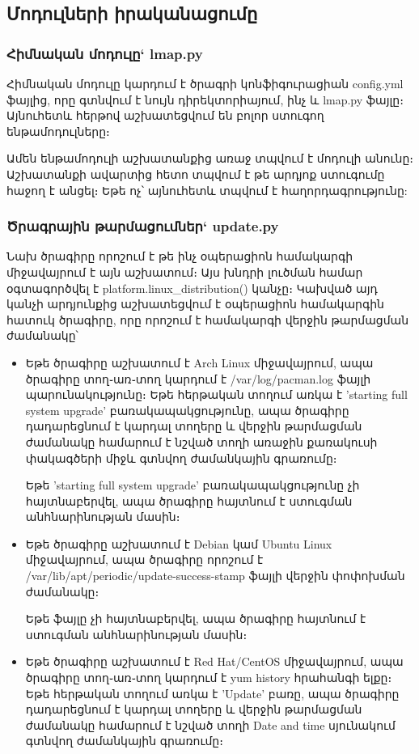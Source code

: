 \documentclass[a4paper,12pt]{article}
\begin{document}
\begin{sloppypar}
\subsection{Մոդուլների իրականացումը}


\subsubsection{Հիմնական մոդուլը` lmap.py}


Հիմնական մոդուլը կարդում է ծրագրի կոնֆիգուրացիան config.yml ֆայլից,
որը գտնվում է նույն դիրեկտորիայում, ինչ և lmap.py ֆայլը։ Այնուհետև
հերթով աշխատեցվում են բոլոր ստուգող ենթամոդուլները։

Ամեն ենթամոդուլի աշխատանքից առաջ տպվում է մոդուլի անունը։
Աշխատանքի ավարտից հետո տպվում է թե արդյոք ստուգումը հաջող է անցել։
Եթե ոչ՝ այնուհետև տպվում է հաղորդագրությունը:


\subsubsection{Ծրագրային թարմացումներ` update.py}


Նախ ծրագիրը որոշում է թե ինչ օպերացիոն համակարգի միջավայրում է այն աշխատում։
Այս խնդրի լուծման համար օգտագործվել է platform.linux\_distribution() կանչը։
Կախված այդ կանչի արդյունքից աշխատեցվում է օպերացիոն համակարգին հատուկ
ծրագիրը, որը որոշում է համակարգի վերջին թարմացման ժամանակը՝

\begin{itemize}
\item Եթե ծրագիրը աշխատում է Arch Linux միջավայրում, ապա ծրագիրը տող֊առ֊տող
    կարդում է /var/log/pacman.log ֆայլի պարունակությունը։ Եթե հերթական տողում առկա է
	'starting full system upgrade' բառակապակցությունը, ապա ծրագիրը դադարեցնում
	է կարդալ տողերը և վերջին թարմացման ժամանակը համարում է նշված տողի առաջին
	քառակուսի փակագծերի միջև գտնվող ժամանկային գրառումը։

	Եթե 'starting full system upgrade' բառակապակցությունը չի հայտնաբերվել,
	ապա ծրագիրը հայտնում է ստուգման անհնարինության մասին։
\item Եթե ծրագիրը աշխատում է Debian կամ Ubuntu Linux միջավայրում, ապա ծրագիրը
	որոշում է /var/lib/apt/periodic/update-success-stamp ֆայլի վերջին փոփոխման
	ժամանակը։

	Եթե ֆայլը չի հայտնաբերվել, ապա ծրագիրը հայտնում է ստուգման անհնարինության
	մասին։
\item Եթե ծրագիրը աշխատում է Red Hat/CentOS միջավայրում, ապա ծրագիրը տող֊առ֊տող
    կարդում է yum history հրահանգի ելքը։ Եթե հերթական տողում առկա է
	'Update' բառը, ապա ծրագիրը դադարեցնում
	է կարդալ տողերը և վերջին թարմացման ժամանակը համարում է նշված տողի 
	Date and time սյունակում գտնվող ժամանկային գրառումը։


\end{itemize}
\end{sloppypar}
\end{document}
